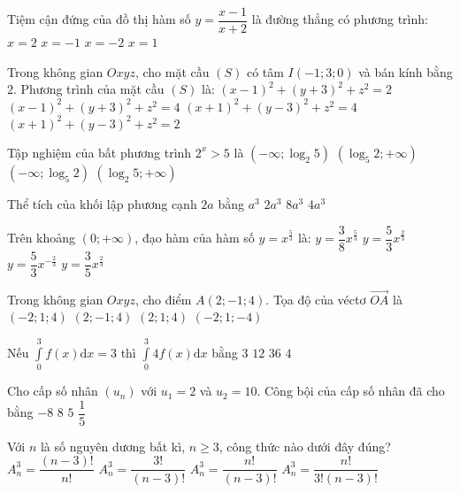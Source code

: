 \begin{ex}%
Tiệm cận đứng của đồ thị hàm số $y=\dfrac{x-1}{x+2}$ là đường thẳng có phương trình:
\choice
{$x=2$}
{$x=-1$}
{\True $x=-2$}
{$x=1$}

\end{ex}
\begin{ex}%
Trong không gian $O x y z$, cho mặt cầu $(S)$ có tâm $I(-1; 3; 0)$ và bán kính bằng $2$. Phương trình của mặt cầu $(S)$ là:
\choice
{$(x-1)^2+(y+3)^2+z^2=2$}
{$(x-1)^2+(y+3)^2+z^2=4$}
{\True $(x+1)^2+(y-3)^2+z^2=4$}
{$(x+1)^2+(y-3)^2+z^2=2$}

\end{ex}
\begin{ex}%
Tập nghiệm của bất phương trình $2^{x}>5$ là
\choice
{$\left(-\infty; \log_2 5\right)$}
{$\left(\log_5 2;+\infty\right)$}
{$\left(-\infty; \log_5 2\right)$}
{\True $\left(\log_2 5;+\infty\right)$}

\end{ex}
\begin{ex}%
Thể tích của khối lập phương cạnh $2a$ bằng
\choice
{$a^3$}
{$2 a^3$}
{\True $8 a^3$}
{$4 a^3$}

\end{ex}
\begin{ex}%
Trên khoảng $(0;+\infty)$, đạo hàm của hàm số $y=x^{\frac{5}{3}}$ là:
\choice
{$y=\dfrac{3}{8} x^{\frac{5}{3}}$}
{\True $y=\dfrac{5}{3} x^{\frac{2}{3}}$}
{$y=\dfrac{5}{3} x^{-\frac{2}{3}}$}
{$y=\dfrac{3}{5} x^{\frac{2}{3}}$}

\end{ex}
\begin{ex}%
Trong không gian $O x y z$, cho điểm $A(2;-1; 4)$. Tọa độ của véctơ $\overrightarrow{OA}$ là
\choice
{$(-2; 1; 4)$}
{\True $(2;-1; 4)$}
{$(2; 1; 4)$}
{$(-2; 1;-4)$}

\end{ex}
\begin{ex}%
Nếu $\displaystyle\int\limits_0^3 f(x) \mathrm{d} x=3$ thì $\displaystyle\int\limits_0^3 4 f(x) \mathrm{d} x$ bằng
\choice
{$3$}
{\True $12$}
{$36$}
{$4$}

\end{ex}
\begin{ex}%
Cho cấp số nhân $\left(u_n\right)$ với $u_1=2$ và $u_2=10$. Công bội của cấp số nhân đã cho bằng
\choice
{$-8$}
{$8$}
{\True $5$}
{$\dfrac{1}{5}$}

\end{ex}
\begin{ex}%
Với $n$ là số nguyên dương bất kì, $n \geq 3$, công thức nào dưới đây đúng?
\choice
{$A_n^3=\dfrac{(n-3) !}{n !}$}
{$A_n^3=\dfrac{3!}{(n-3) !}$}
{\True $A_n^3=\dfrac{n !}{(n-3) !}$}
{$A_n^3=\dfrac{n !}{3!(n-3) !}$}

\end{ex}
